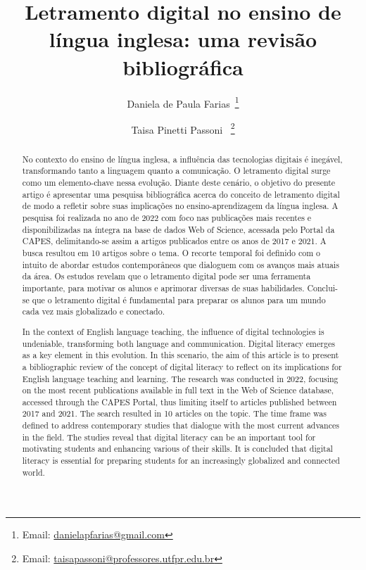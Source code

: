 \documentclass[portuguese]{textolivre}
\title{Letramento digital no ensino de língua inglesa: uma revisão bibliográfica}
\author[1]{Daniela de Paula Farias~\orcid{0000-0002-7356-6836}\thanks{Email: \href{mailto:danielapfarias@gmail.com}{danielapfarias@gmail.com}}}
\author[1]{Taisa Pinetti Passoni ~\orcid{0000-0001-7819-1327}\thanks{Email: \href{mailto:taisapassoni@professores.utfpr.edu.br}{taisapassoni@professores.utfpr.edu.br}}}
\affil[1]{Universidade Tecnológica Federal do Paraná, Pato Branco, PR, Brasil.}
\begin{document}
\maketitle
\begin{polyabstract}
\begin{abstract}
  No contexto do ensino de língua inglesa, a influência das tecnologias digitais é inegável, transformando tanto a linguagem quanto a comunicação. O letramento digital surge como um elemento-chave nessa evolução. Diante deste cenário, o objetivo do presente artigo é apresentar uma pesquisa bibliográfica acerca do conceito de letramento digital de modo a refletir sobre suas implicações no ensino-aprendizagem da língua inglesa. A pesquisa foi realizada no ano de 2022 com foco nas publicações mais recentes e disponibilizadas na íntegra na base de dados Web of Science, acessada pelo Portal da CAPES, delimitando-se assim a artigos publicados entre os anos de 2017 e 2021. A busca resultou em 10 artigos sobre o tema. O recorte temporal foi definido com o intuito de abordar estudos contemporâneos que dialoguem com os avanços mais atuais da área. Os estudos revelam que o letramento digital pode ser uma ferramenta importante, para motivar os alunos e aprimorar diversas de suas habilidades. Conclui-se que o letramento digital é fundamental para preparar os alunos para um mundo cada vez mais globalizado e conectado.

\end{abstract}

\begin{english}
\begin{abstract}
  In the context of English language teaching, the influence of digital technologies is undeniable, transforming both language and communication. Digital literacy emerges as a key element in this evolution. In this scenario, the aim of this article is to present a bibliographic review of the concept of digital literacy to reflect on its implications for English language teaching and learning. The research was conducted in 2022, focusing on the most recent publications available in full text in the Web of Science database, accessed through the CAPES Portal, thus limiting itself to articles published between 2017 and 2021. The search resulted in 10 articles on the topic. The time frame was defined to address contemporary studies that dialogue with the most current advances in the field. The studies reveal that digital literacy can be an important tool for motivating students and enhancing various of their skills. It is concluded that digital literacy is essential for preparing students for an increasingly globalized and connected world.

\end{abstract}
\end{english}
\end{polyabstract}
\end{document}
